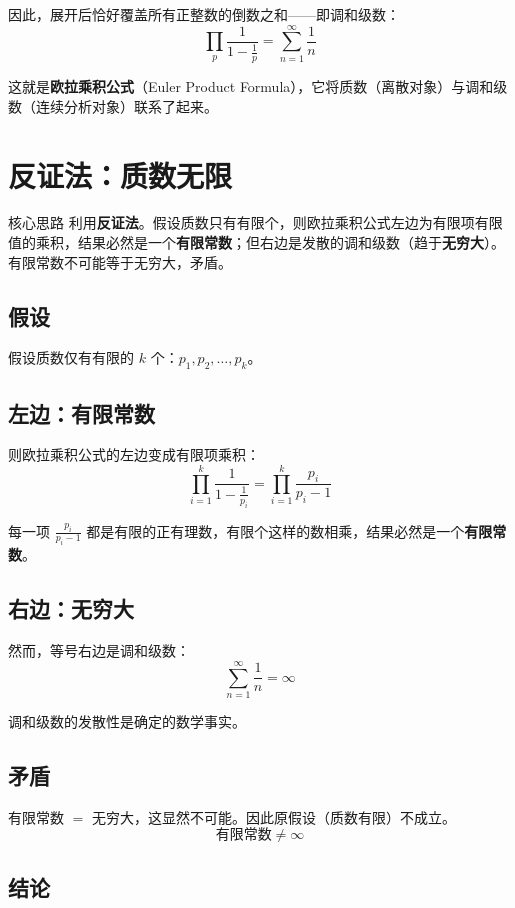 \documentclass[11pt,a4paper]{ctexart}
\newcommand{\highlight}[1]{\colorbox{accent!20}{\sffamily\bfseries #1}}
\begin{document}
因此，展开后恰好覆盖所有正整数的倒数之和——即调和级数：
\[
  \prod_{p} \frac{1}{1 - \frac{1}{p}} = \sum_{n=1}^{\infty} \frac{1}{n}
\]

这就是\highlight{欧拉乘积公式}（Euler Product Formula），它将质数（离散对象）与调和级数（连续分析对象）联系了起来。

\section{反证法：质数无限}

\begin{methodbox}{核心思路}
利用\highlight{反证法}。假设质数只有有限个，则欧拉乘积公式左边为有限项有限值的乘积，结果必然是一个\highlight{有限常数}；但右边是发散的调和级数（趋于\highlight{无穷大}）。有限常数不可能等于无穷大，矛盾。
\end{methodbox}

\subsection*{假设}

假设质数仅有有限的 $k$ 个：$p_1, p_2, \ldots, p_k$。

\subsection*{左边：有限常数}

则欧拉乘积公式的左边变成有限项乘积：
\[
  \prod_{i=1}^{k} \frac{1}{1 - \frac{1}{p_i}} = \prod_{i=1}^{k} \frac{p_i}{p_i - 1}
\]

每一项 $\frac{p_i}{p_i - 1}$ 都是有限的正有理数，有限个这样的数相乘，结果必然是一个\highlight{有限常数}。

\subsection*{右边：无穷大}

然而，等号右边是调和级数：
\[
  \sum_{n=1}^{\infty} \frac{1}{n} = \infty
\]

调和级数的发散性是确定的数学事实。

\subsection*{矛盾}

有限常数 $=$ 无穷大，这显然不可能。因此原假设（质数有限）不成立。
\[
  \boxed{\text{有限常数} \neq \infty}
\]

\subsection*{结论}
\end{document}
